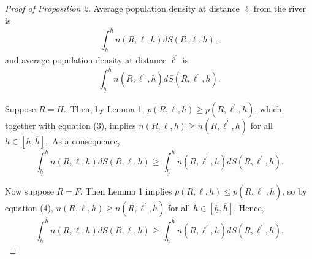 \documentclass[12pt]{article}
\begin{document}
\begin{proof}[Proof of Proposition 2]
Average population density at distance $\ell $ from the river is%
\begin{equation*}
\int_{\underline{h}}^{\overline{h}}n\left( R,\ell ,h\right) dS\left( R,\ell
,h\right) ,
\end{equation*}%
and average population density at distance $\ell ^{\prime }$ is%
\begin{equation*}
\int_{\underline{h}}^{\overline{h}}n\left( R,\ell ^{\prime },h\right)
dS\left( R,\ell ^{\prime },h\right) .
\end{equation*}

Suppose $R=H$.\ Then, by Lemma 1, $p\left( R,\ell ,h\right) \geq p\left(
R,\ell ^{\prime },h\right) $, which, together with equation (3), implies $%
n\left( R,\ell ,h\right) \geq n\left( R,\ell ^{\prime },h\right) $ for all $%
h\in \left[ \underline{h},\overline{h}\right] $.\ As a consequence,%
\begin{equation*}
\int_{\underline{h}}^{\overline{h}}n\left( R,\ell ,h\right) dS\left( R,\ell
,h\right) \geq \int_{\underline{h}}^{\overline{h}}n\left( R,\ell ^{\prime
},h\right) dS\left( R,\ell ^{\prime },h\right) .
\end{equation*}

Now suppose $R=F$. Then Lemma 1 implies $p\left( R,\ell ,h\right) \leq
p\left( R,\ell ^{\prime },h\right) $, so by equation (4), $n\left( R,\ell
,h\right) \geq n\left( R,\ell ^{\prime },h\right) $ for all $h\in \left[ 
\underline{h},\overline{h}\right] $. Hence,%
\begin{equation*}
\int_{\underline{h}}^{\overline{h}}n\left( R,\ell ,h\right) dS\left( R,\ell
,h\right) \geq \int_{\underline{h}}^{\overline{h}}n\left( R,\ell ^{\prime
},h\right) dS\left( R,\ell ^{\prime },h\right) .
\end{equation*}
\end{proof}
\end{document}

